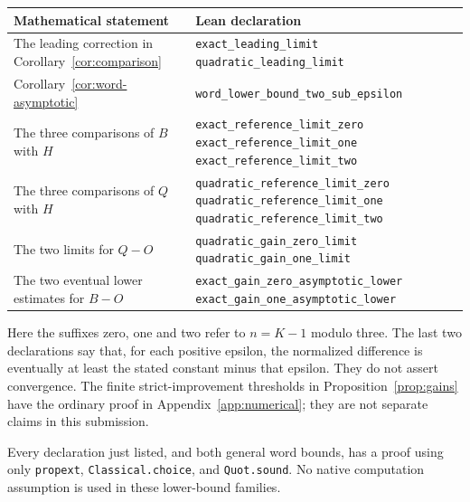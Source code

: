 \begin{center}
\small
\begin{tabular}{@{}>{\raggedright\arraybackslash}p{}
                  >{\raggedright\arraybackslash}p{}@{}}
\toprule
Mathematical statement & Lean declaration\\
\midrule
The leading correction in Corollary~\ref{cor:comparison}
& \nolinkurl{exact_leading_limit}\newline
  \nolinkurl{quadratic_leading_limit}\\[3pt]
Corollary~\ref{cor:word-asymptotic}
& \nolinkurl{word_lower_bound_two_sub_epsilon}\\[3pt]
The three comparisons of $B$ with $H$
& \nolinkurl{exact_reference_limit_zero}\newline
  \nolinkurl{exact_reference_limit_one}\newline
  \nolinkurl{exact_reference_limit_two}\\[3pt]
The three comparisons of $Q$ with $H$
& \nolinkurl{quadratic_reference_limit_zero}\newline
  \nolinkurl{quadratic_reference_limit_one}\newline
  \nolinkurl{quadratic_reference_limit_two}\\[3pt]
The two limits for $Q-O$
& \nolinkurl{quadratic_gain_zero_limit}\newline
  \nolinkurl{quadratic_gain_one_limit}\\[3pt]
The two eventual lower estimates for $B-O$
& \nolinkurl{exact_gain_zero_asymptotic_lower}\newline
  \nolinkurl{exact_gain_one_asymptotic_lower}\\
\bottomrule
\end{tabular}
\end{center}

Here the suffixes zero, one and two refer to $n=K-1$ modulo three.
The last two declarations say that, for each positive epsilon, the
normalized difference is eventually at least the stated constant minus
that epsilon. They do not assert convergence. The finite strict-improvement
thresholds in Proposition~\ref{prop:gains} have the ordinary proof in
Appendix~\ref{app:numerical}; they are not separate claims in this
submission.

Every declaration just listed, and both general word bounds, has a proof
using only \nolinkurl{propext}, \nolinkurl{Classical.choice}, and
\nolinkurl{Quot.sound}. No native computation assumption is used in these
lower-bound families.
